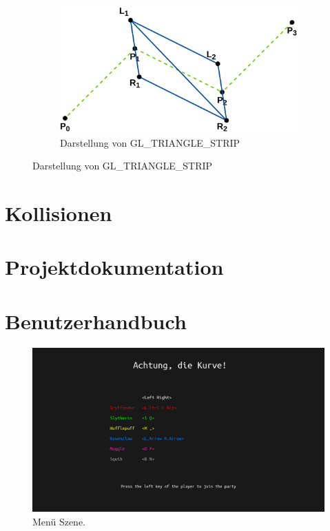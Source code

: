 \documentclass[doktyp=studarbeit]{TUBAFarbeiten}
\begin{document}
\begin{figure}[!htb]
\begin{subfigure}[b]{0.45\textwidth}
        \includegraphics[width=1\linewidth]{Schlangenlinie-8.png}
        \caption{Darstellung von GL\_TRIANGLE\_STRIP}
    \end{subfigure}
    \caption{Darstellung von GL\_TRIANGLE\_STRIP}
	\label{fig:line}
\end{figure}

\section{Kollisionen}

\section{Projektdokumentation}

\section{Benutzerhandbuch}

\begin{figure}[!htb]
	\centering
	\includegraphics[width=0.8\linewidth]{1.png}
	\caption{Menü Szene.}
	\label{fig:menu}
\end{figure}
\end{document}
